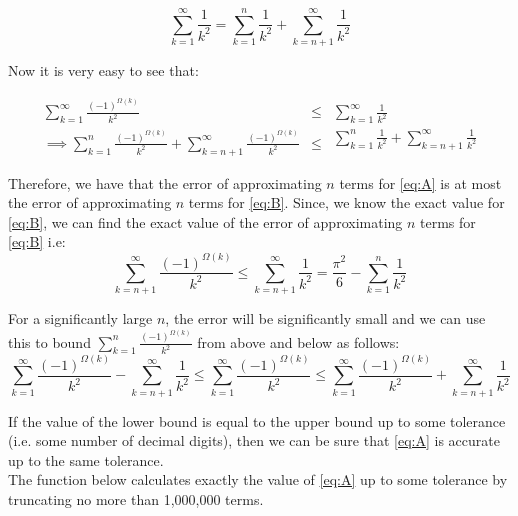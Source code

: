 \documentclass[11pt]{report}
\begin{document}
\begin{equation*}
	\sum_{k=1}^{\infty} \frac{1}{k^2} = \sum_{k=1}^{n} \frac{1}{k^2} + \sum_{k=n+1}^{\infty} \frac{1}{k^2}
\end{equation*}

Now it is very easy to see that:

\begin{equation*}
\begin{aligned}\sum_{k=1}^{\infty} \frac{(-1)^{\Omega(k)}}{k^2} &\le{}\\ \implies \sum_{k=1}^{n} \frac{(-1)^{\Omega(k)}}{k^2} + \sum_{k=n+1}^{\infty} \frac{(-1)^{\Omega(k)}}{k^2} &\le{} \end{aligned}\!
\begin{gathered}\sum_{k=1}^{\infty} \frac{1}{k^2}\\ \sum_{k=1}^{n} \frac{1}{k^2} + \sum_{k=n+1}^{\infty} \frac{1}{k^2} \end{gathered}\!
\end{equation*}

Therefore, we have that the error of approximating $n$ terms for \eqref{eq:A} is at most the error of approximating $n$ terms for \eqref{eq:B}. Since, we know the exact value for \eqref{eq:B}, we can find the exact value of the error of approximating $n$ terms for \eqref{eq:B} i.e:
\begin{equation}
	\sum_{k=n+1}^{\infty} \frac{(-1)^{\Omega(k)}}{k^2} \leq \sum_{k=n+1}^{\infty} \frac{1}{k^2} = \frac{\pi^2}{6} - \sum_{k=1}^{n} \frac{1}{k^2}
\end{equation}

For a significantly large $n$, the error will be significantly small and we can use this to bound $\sum\limits_{k=1}^{n} \frac{(-1)^{\Omega(k)}}{k^2}$ from above and below as follows:
\begin{equation}
	\sum_{k=1}^{\infty} \frac{(-1)^{\Omega(k)}}{k^2} - \sum_{k=n+1}^{\infty} \frac{1}{k^2} \leq \sum_{k=1}^{\infty} \frac{(-1)^{\Omega(k)}}{k^2} \leq \sum_{k=1}^{\infty} \frac{(-1)^{\Omega(k)}}{k^2} + \sum_{k=n+1}^{\infty} \frac{1}{k^2} \label{eq:bounds}
\end{equation}

If the value of the lower bound is equal to the upper bound up to some tolerance (i.e. some number of decimal digits), then we can be sure that \eqref{eq:A} is accurate up to the same tolerance. \\

The function below calculates exactly the value of \eqref{eq:A} up to some tolerance by truncating no more than 1,000,000 terms. \\
\end{document}
